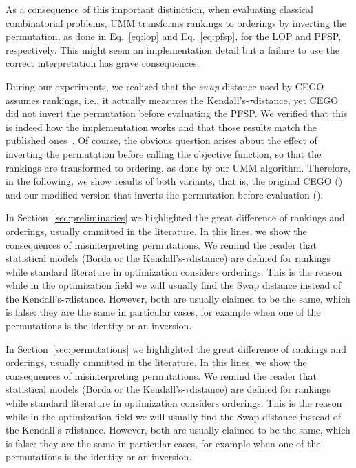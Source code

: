 \documentclass[sigconf,dvipsnames]{acmart}
\newcommand{\ken}{Kendall's-$\tau$}
\begin{document}
As a consequence of this important distinction, when evaluating classical
combinatorial problems, UMM transforms rankings to orderings by inverting the
permutation, as done in Eq.~\ref{eq:lop} and Eq.~\ref{eq:pfsp}, for the LOP and
PFSP, respectively. This might seem an implementation detail but a failure to use the correct interpretation has grave consequences.

During our experiments, we realized that the \emph{swap} distance used by CEGO
assumes rankings, i.e., it actually measures the \ken distance, yet CEGO did
not invert the permutation before evaluating the PFSP. We verified that this is
indeed how the implementation works and that those results match the published
ones~\citep{ZaeStoBar2014:ppsn}. Of course, the obvious question arises about the effect of inverting the permutation before calling the objective
function, so that the rankings are transformed to ordering, as done by our UMM
algorithm. Therefore, in the following, we show results of both variants, that is, the original CEGO (\CEGOorig) and our modified version that inverts the permutation before evaluation (\CEGOinv).


In Section~\ref{sec:preliminaries} we highlighted the great difference of rankings and orderings, usually ommitted in the literature. In this lines, we show the consequences of misinterpreting permutations. We remind the reader that statistical models (Borda or the \ken distance) are defined for rankings while standard literature in optimization considers orderings. This is the reason while in the optimization field we will usually find the Swap distance instead of the \ken distance. However, both are usually claimed to be the same, which is false: they are the same in particular cases, for example when  one of the permutations is the identity or an inversion. 


In Section~\ref{sec:permutations} we highlighted the great difference of rankings and orderings, usually ommitted in the literature. In this lines, we show the consequences of misinterpreting permutations. We remind the reader that statistical models (Borda or the \ken distance) are defined for rankings while standard literature in optimization considers orderings. This is the reason while in the optimization field we will usually find the Swap distance instead of the \ken distance. However, both are usually claimed to be the same, which is false: they are the same in particular cases, for example when  one of the permutations is the identity or an inversion. 
 
\end{document}
